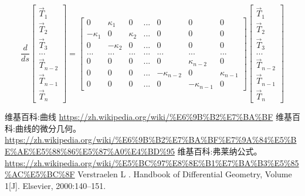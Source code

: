 \documentclass[fontset=windows]{article}
\begin{document}
$$
\frac{d}{ds}
\begin{bmatrix}
    \vec{T}_1 \\
    \vec{T}_2 \\
    \vec{T}_3 \\
    ...       \\
    \vec{T}_{n-2}\\
    \vec{T}_{n-1}\\
    \vec{T}_{n}
\end{bmatrix} = 
\begin{bmatrix}
        0    &\kappa_1 &    0   &...& 0 & 0 & 0\\
    -\kappa_1&   0     &\kappa_2&...& 0 & 0 & 0\\
    0        &-\kappa_2&   0    &...& 0 & 0 & 0\\
    ...      &   ...   &   ...  &...& ... & ... &  ... \\
    0        &    0    &   0    &...& 0 & \kappa_{n-2} & 0 \\
    0        &    0    &   0    &...&-\kappa_{n-2}& 0  & \kappa_{n-1}\\
    0        &    0    &   0    &...& 0 &-\kappa_{n-1} &  0
\end{bmatrix}
\begin{bmatrix}
    \vec{T}_1 \\
    \vec{T}_2 \\
    \vec{T}_3 \\
    ...       \\
    \vec{T}_{n-2}\\
    \vec{T}_{n-1}\\
    \vec{T}_{n}
\end{bmatrix}
$$


\begin{thebibliography}{30}
     维基百科:曲线 \url{https://zh.wikipedia.org/wiki/%E6%9B%B2%E7%BA%BF}
     维基百科:曲线的微分几何。 \url{https://zh.wikipedia.org/wiki/%E6%9B%B2%E7%BA%BF%E7%9A%84%E5%BE%AE%E5%88%86%E5%87%A0%E4%BD%95}
     维基百科:弗莱纳公式。 \url{https://zh.wikipedia.org/wiki/%E5%BC%97%E8%8E%B1%E7%BA%B3%E5%85%AC%E5%BC%8F}
     Verstraelen L . Handbook of Differential Geometry, Volume 1[J]. Elsevier, 2000:140–151.

\end{thebibliography}
\end{document}
